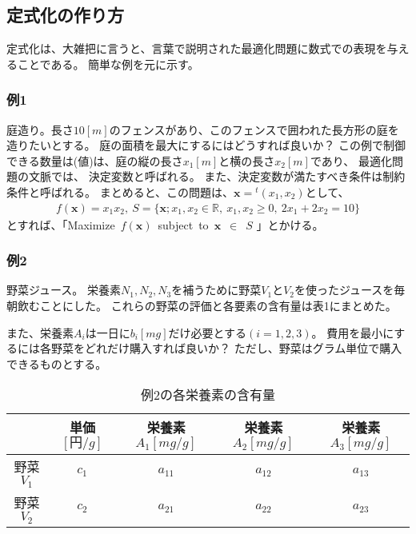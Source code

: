 \documentclass[12pt]{jarticle}
\begin{document}
\subsection{定式化の作り方}
定式化は、大雑把に言うと、言葉で説明された最適化問題に数式での表現を与えることである。
簡単な例を元に示す。

\subsubsection*{例1}
庭造り。長さ$10[m]$のフェンスがあり、このフェンスで囲われた長方形の庭を造りたいとする。
庭の面積を最大にするにはどうすれば良いか？
この例で制御できる数量は(値)は、庭の縦の長さ$x_1[m]$と横の長さ$x_2[m]$であり、
最適化問題の文脈では、
決定変数と呼ばれる。
また、決定変数が満たすべき条件は制約条件と呼ばれる。
まとめると、この問題は、$\boldsymbol{x}={}^t(x_1,x_2)$として、
\begin{eqnarray}
    f(\boldsymbol{x})=x_1x_2,\ S=\{\boldsymbol{x}; x_1,x_2\in \mathbb{R},\ x_1,x_2\geq 0,\ 2x_1+2x_2=10\} \nonumber
\end{eqnarray}
とすれば、「Maximize\ $f(\boldsymbol{x})$\ subject\ to\ $\boldsymbol{x}$\ $\in$\ $S$ 」とかける。


\subsubsection*{例2}
野菜ジュース。
栄養素$N_1,N_2,N_3$を補うために野菜$V_1$と$V_2$を使ったジュースを毎朝飲むことにした。
これらの野菜の評価と各要素の含有量は表1にまとめた。

また、栄養素$A_i$は一日に$b_i[mg]$だけ必要とする$(i=1,2,3)$。
費用を最小にするには各野菜をどれだけ購入すれば良いか？
ただし、野菜はグラム単位で購入できるものとする。

\begin{table}[htb]
    \begin{center}
        \caption{例2の各栄養素の含有量}
        \begin{tabular}{|c|c|c|c|c|}
            \hline
                      & 単価$[円/g]$ & 栄養素$A_1[mg/g]$ & 栄養素$A_2[mg/g]$ & 栄養素$A_3[mg/g]$ \\
            \hline
            野菜$V_1$ & $c_1$        & $a_{11}$          & $a_{12}$          & $a_{13}$          \\
            野菜$V_2$ & $c_2$        & $a_{21}$          & $a_{22}$          & $a_{23}$          \\
            \hline
        \end{tabular}
    \end{center}
\end{table}
\end{document}
